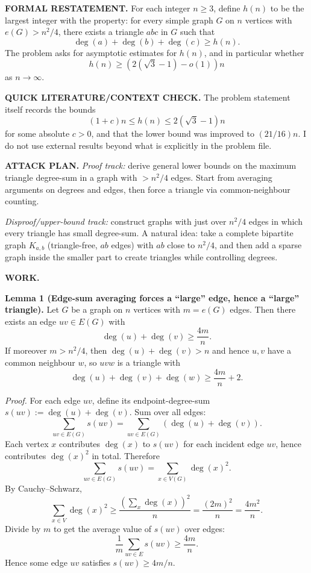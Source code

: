 \textbf{FORMAL RESTATEMENT.}
For each integer $n\ge 3$, define $h(n)$ to be the largest integer with the property:
for every simple graph $G$ on $n$ vertices with $e(G) > n^2/4$, there exists a triangle $abc$ in $G$ such that
\[
\deg(a)+\deg(b)+\deg(c) \ge h(n).
\]
The problem asks for asymptotic estimates for $h(n)$, and in particular whether
\[
 h(n) \ge (2(\sqrt{3}-1)-o(1))n
\]
as $n\to\infty$.

\textbf{QUICK LITERATURE/CONTEXT CHECK.}
The problem statement itself records the bounds
\[
(1+c)n \le h(n) \le 2(\sqrt{3}-1)n
\]
for some absolute $c>0$, and that the lower bound was improved to $(21/16)n$.
I do not use external results beyond what is explicitly in the problem file.

\textbf{ATTACK PLAN.}
\emph{Proof track:} derive general lower bounds on the maximum triangle degree-sum in a graph with $>n^2/4$ edges.
Start from averaging arguments on degrees and edges, then force a triangle via common-neighbour counting.

\emph{Disproof/upper-bound track:} construct graphs with just over $n^2/4$ edges in which every triangle has small degree-sum.
A natural idea: take a complete bipartite graph $K_{a,b}$ (triangle-free, $ab$ edges) with $ab$ close to $n^2/4$, and then add a sparse graph inside the smaller part to create triangles while controlling degrees.

\textbf{WORK.}

\textbf{Lemma 1 (Edge-sum averaging forces a ``large'' edge, hence a ``large'' triangle).}
Let $G$ be a graph on $n$ vertices with $m=e(G)$ edges.
Then there exists an edge $uv\in E(G)$ with
\[
\deg(u)+\deg(v) \ge \frac{4m}{n}.
\]
If moreover $m>n^2/4$, then $\deg(u)+\deg(v) > n$ and hence $u,v$ have a common neighbour $w$, so $uvw$ is a triangle with
\[
\deg(u)+\deg(v)+\deg(w) \ge \frac{4m}{n} + 2.
\]

\emph{Proof.}
For each edge $uv$, define its endpoint-degree-sum $s(uv):=\deg(u)+\deg(v)$.
Sum over all edges:
\[
\sum_{uv\in E(G)} s(uv) = \sum_{uv\in E(G)} (\deg(u)+\deg(v)).
\]
Each vertex $x$ contributes $\deg(x)$ to $s(uv)$ for each incident edge $uv$, hence contributes $\deg(x)^2$ in total.
Therefore
\[
\sum_{uv\in E(G)} s(uv) = \sum_{x\in V(G)} \deg(x)^2.
\]
By Cauchy--Schwarz,
\[
\sum_{x\in V} \deg(x)^2 \ge \frac{\left(\sum_x \deg(x)\right)^2}{n} = \frac{(2m)^2}{n} = \frac{4m^2}{n}.
\]
Divide by $m$ to get the average value of $s(uv)$ over edges:
\[
\frac{1}{m}\sum_{uv\in E} s(uv) \ge \frac{4m}{n}.
\]
Hence some edge $uv$ satisfies $s(uv)\ge 4m/n$.

